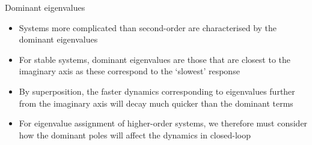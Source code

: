 \documentclass{beamer-control}
\begin{document}

\begin{frame}{Dominant eigenvalues}
\begin{itemize}
\item Systems more complicated than second-order are characterised by the dominant eigenvalues
\item For stable systems, dominant eigenvalues are those that are closest to the imaginary axis as these correspond to the `slowest' response
\item By superposition, the faster dynamics corresponding to eigenvalues further from the imaginary axis will decay much quicker than the dominant terms
\item For eigenvalue assignment of higher-order systems, we therefore must consider how the dominant poles will affect the dynamics in closed-loop
\end{itemize}
\end{frame}


\SUMMARYFRAME
\FINALE
\end{document}
